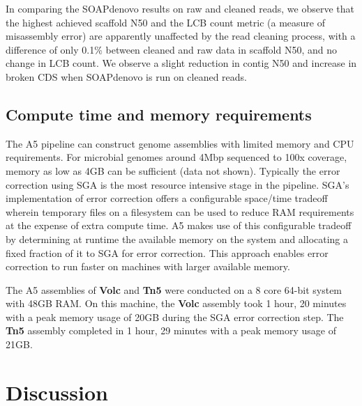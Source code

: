 \documentclass[10pt]{article}
\begin{document}
In comparing the SOAPdenovo results on raw and cleaned reads, we observe that the highest achieved scaffold N50 and the LCB count metric (a measure of misassembly error) are apparently unaffected by the read cleaning process, with a difference of only 0.1\% between cleaned and raw data in scaffold N50, and no change in LCB count.  We observe a slight reduction in contig N50 and increase in broken CDS when SOAPdenovo is run on cleaned reads.

\subsection*{Compute time and memory requirements}

The A5 pipeline can construct genome assemblies with limited memory and CPU requirements. 
For microbial genomes around 4Mbp sequenced to 100x coverage, memory as low as 4GB can be sufficient (data not shown). 
Typically the error correction using SGA is the most resource intensive stage in the pipeline. 
SGA's implementation of error correction offers a configurable space/time tradeoff wherein temporary files on a filesystem can be used to reduce RAM requirements at the expense of extra compute time. 
A5 makes use of this configurable tradeoff by determining at runtime the available memory on the system and allocating a fixed fraction of it to SGA for error correction.
This approach enables error correction to run faster on machines with larger available memory.

The A5 assemblies of \textbf{Volc} and \textbf{Tn5} were conducted on a 8 core 64-bit system with 48GB RAM. On this machine, the \textbf{Volc} assembly took 1 hour, 20 minutes with a peak memory usage of 20GB during the SGA error correction step. The \textbf{Tn5} assembly completed in 1 hour, 29 minutes with a peak memory usage of 21GB.

\section*{Discussion}
\end{document}
